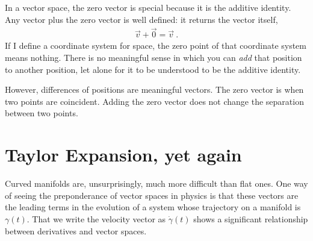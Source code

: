 \documentclass[12pt, oneside]{report}    %
\let\oldsection\section
\def\section{%
  \setcounter{sidenote}{1}%
  \oldsection
}
\begin{document}
\begin{example}
In a vector space, the zero vector is special because it is the additive identity. Any vector plus the zero vector is well defined: it returns the vector itself,
\begin{align}
    \vec{v} + \vec{0} = \vec{v} \ .
\end{align}
If I define a coordinate system for space, the zero point of that coordinate system means nothing. There is no meaningful sense in which you can \emph{add} that position to another position, let alone for it to be understood to be the additive identity. 

However, differences of positions are meaningful vectors. The zero vector is when two points are coincident. Adding the zero vector does not change the separation between two points. 
\end{example}


\section{Taylor Expansion, yet again}

Curved manifolds are, unsurprisingly, much more difficult than flat ones. One way of seeing the preponderance of vector spaces in physics is that these vectors are the leading terms in the evolution of a system whose trajectory on a manifold is $\gamma(t)$. That we write the velocity vector as $\dot\gamma(t)$ shows a significant relationship between derivatives and vector spaces. 
\end{document}
